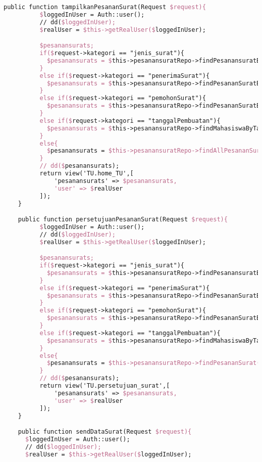 \begin{lstlisting}[language=tex,basicstyle=\tiny,caption=PesanansuratController.php]
    public function tampilkanPesananSurat(Request $request){
          $loggedInUser = Auth::user();
          // dd($loggedInUser);
          $realUser = $this->getRealUser($loggedInUser);

          $pesanansurats;
          if($request->kategori == "jenis_surat"){
            $pesanansurats = $this->pesanansuratRepo->findPesanansuratByJenisSurat($request->searchBox);
          }
          else if($request->kategori == "penerimaSurat"){
            $pesanansurats = $this->pesanansuratRepo->findPesananSuratByPenerimaSurat($request->searchBox);
          }
          else if($request->kategori == "pemohonSurat"){
            $pesanansurats = $this->pesanansuratRepo->findPesananSuratByPemohonSurat($request->searchBox);
          }
          else if($request->kategori == "tanggalPembuatan"){
            $pesanansurats = $this->pesanansuratRepo->findMahasiswaByTanggalPembuatan($request->searchBox);
          }
          else{
            $pesanansurats = $this->pesanansuratRepo->findAllPesananSurat();
          }
          // dd($pesanansurats);
          return view('TU.home_TU',[
              'pesanansurats' => $pesanansurats,
              'user' => $realUser
          ]);
  	}

    public function persetujuanPesananSurat(Request $request){
          $loggedInUser = Auth::user();
          // dd($loggedInUser);
          $realUser = $this->getRealUser($loggedInUser);

          $pesanansurats;
          if($request->kategori == "jenis_surat"){
            $pesanansurats = $this->pesanansuratRepo->findPesanansuratByJenisSurat($request->searchBox);
          }
          else if($request->kategori == "penerimaSurat"){
            $pesanansurats = $this->pesanansuratRepo->findPesananSuratByPenerimaSurat($request->searchBox);
          }
          else if($request->kategori == "pemohonSurat"){
            $pesanansurats = $this->pesanansuratRepo->findPesananSuratByPemohonSurat($request->searchBox);
          }
          else if($request->kategori == "tanggalPembuatan"){
            $pesanansurats = $this->pesanansuratRepo->findMahasiswaByTanggalPembuatan($request->searchBox);
          }
          else{
            $pesanansurats = $this->pesanansuratRepo->findPesananSurat();
          }
          // dd($pesanansurats);
          return view('TU.persetujuan_surat',[
              'pesanansurats' => $pesanansurats,
              'user' => $realUser
          ]);
  	}

    public function sendDataSurat(Request $request){
      $loggedInUser = Auth::user();
      // dd($loggedInUser);
      $realUser = $this->getRealUser($loggedInUser);
      

\end{lstlisting}
